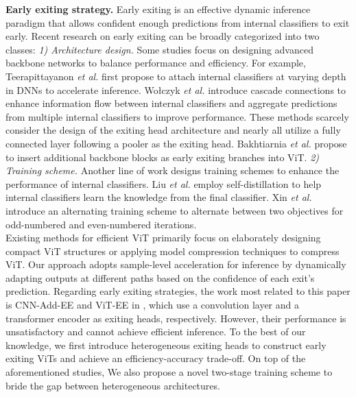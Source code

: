 \noindent
\textbf{Early exiting strategy. }
Early exiting is an effective dynamic inference paradigm that allows confident enough predictions from internal classifiers to exit early. 
Recent research on early exiting can be broadly categorized into two classes: 
\textit{1) Architecture design.} 
Some studies focus on designing advanced backbone networks to balance performance and efficiency. 
For example, Teerapittayanon \textit{et al.} \cite{branchynet} first propose to attach internal classifiers at varying depth in DNNs to accelerate inference. 
Wołczyk \textit{et al.} \cite{ztw} introduce cascade connections to enhance information flow between internal classifiers and aggregate predictions from multiple internal classifiers to improve performance. 
These methods scarcely consider the design of the exiting head architecture and nearly all utilize a fully connected layer following a pooler as the exiting head. 
Bakhtiarnia \textit{et al.} \cite{ViT-EE} propose to insert additional backbone blocks as early exiting branches into ViT.
\textit{2) Training scheme.} 
Another line of work designs training schemes to enhance the performance of internal classifiers. 
Liu \textit{et al.} \cite{fastbert} employ self-distillation to help internal classifiers learn the knowledge from the final classifier. 
Xin \textit{et al.} \cite{BERxiT} introduce an alternating training scheme to alternate between two objectives for odd-numbered and even-numbered iterations. \\

Existing methods for efficient ViT primarily focus on elaborately designing compact ViT structures or applying model compression techniques to compress ViT. 
Our approach adopts sample-level acceleration for inference by dynamically adapting outputs at different paths based on the confidence of each exit's prediction. 
Regarding early exiting strategies, 
the work most related to this paper is CNN-Add-EE and ViT-EE in \cite{ViT-EE}, which use a convolution layer and a transformer encoder as exiting heads, respectively.
However, their performance is unsatisfactory and cannot achieve efficient inference. 
To the best of our knowledge, we first introduce heterogeneous exiting heads to construct early exiting ViTs and achieve an efficiency-accuracy trade-off. 
On top of the aforementioned studies, 
We also propose a novel two-stage training scheme to bride the gap between heterogeneous architectures.

